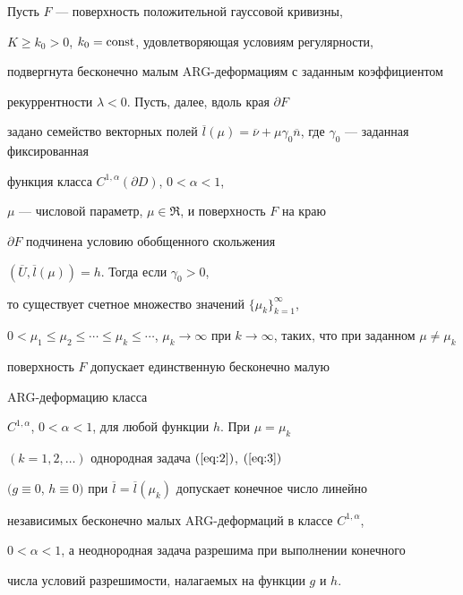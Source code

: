\begin{thm}


Пусть $F$ --- поверхность положительной гауссовой кривизны, 


$K \ge k_0 > 0$, $k_0=\operatorname{const}$, удовлетворяющая условиям регулярности,


подвергнута бесконечно малым ARG-де\-формациям с заданным коэффициентом


рекуррентности $\lambda < 0$. Пусть, далее, вдоль края $\partial F$


задано семейство векторных полей $\overline l (\mu)=\overline


\nu+\mu \gamma_0 \overline {n}$, где $\gamma_0$ --- заданная фиксированная 


функция класса $C^{1,\alpha } ({\partial D})$, $0 < \alpha < 1$,


$\mu$ --- числовой параметр, $\mu \in \Re $, и поверхность $F$ на краю 


$\partial F$ подчинена условию обобщенного скольжения


$ ({\overline U ,\overline l (\mu)})=h$. Тогда если $\gamma_0 > 0$, 


то существует счетное множество значений $ \{ {\mu _k } \}_{k=1}^\infty$,


$0 < \mu_1 \le \mu_2 \le \dotsb \le \mu_k \le \dotsb$, $\mu_k 


\to \infty$ при $k \to \infty$, таких, что при заданном $\mu\ne\mu_k$


поверхность $F$ допускает единственную бесконечно малую


ARG-де\-фор\-мацию класса


$C^{1,\alpha }$, $0 < \alpha < 1$, для любой функции $h$. При $\mu=\mu_k$


$ ({k=1,2,\dotsc})$ однородная задача $(\ref{eq:2})$, $(\ref{eq:3})$


$(g \equiv 0$, $h \equiv 0 )$ при $\overline 


l=\overline l (\mu_k)$ допускает конечное число линейно 


независимых бесконечно малых ARG-деформаций в классе $C^{1,\alpha }$, 


$0 < \alpha < 1$, а неоднородная задача разрешима при выполнении конечного


числа условий разрешимости, налагаемых на функции $g$ и $h$.


\end{thm}






